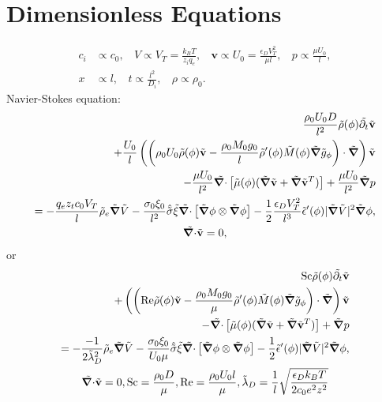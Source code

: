 \documentclass[a4paper,10pt]{article}
\renewcommand{\v}[1]{\mathbf{#1}}
\renewcommand{\v}[1]{\ensuremath{\mathbf{#1}}} %
\newcommand{\ti}[1]{\ensuremath{\tilde{#1}}} %
\newcommand{\gv}[1]{\ensuremath{\mbox{\boldmath$ #1 $}}}
\newcommand{\grad}[1]{\gv{\nabla} #1} %
\renewcommand{\div}[1]{\gv{\nabla} \cdot #1} %
\newcommand{\pdt}[1]{\partial_t #1}
\begin{document}
\section{Dimensionless Equations}
\begin{align}
c_i &\propto c_0, ~~~~ V \propto V_T = \frac{k_B T}{z_i q_e}, ~~~~\v{v} \propto U_0 = \frac{\epsilon_D V_T^2}{\mu l}, ~~~~p \propto \frac{\mu U_0}{l},\\
x &\propto l , ~~~~ t \propto \frac{l^2}{D_i}, ~~~~ \rho \propto \rho_0.
\end{align}
Navier-Stokes equation: 
\begin{gather}
\begin{split}	
\frac{\rho_0 U_0 D}{ l^2}\ti{\rho}(\phi) \ti{\pdt{}} \ti{\v{v}}\\
+ \frac{U_0}{l}\left( \left( \rho_0 
 	U_0 \ti\rho(\phi) \ti{\v{v}} - \frac{\rho_0 M_0 g_0}{l}\ti\rho'(\phi) \ti M(\phi) \ti{\grad{}} \ti g_\phi  \right) \cdot \ti{\grad{}} \right) \ti{\v{v}}\\
- \frac{\mu U_0}{l^2}\ti{\div{}} \left[\ti \mu(\phi)(\ti{\grad{}} \ti{\v{v}} + \ti{\grad{}} \ti{\v{v}} ^T) \right] + \frac{\mu U_0}{l^2}\ti{\grad{}} p \\
= - \frac{q_e z_t c_0 V_T}{l} \ti \rho_e \ti{\grad{}} \ti{V} - \frac{\sigma_0 \xi_0 }{l^2}\hat{\ti{\sigma}} \ti \xi\ti{\div{}} \left[ \ti{\grad{}} \phi \otimes \ti{\grad{}} \phi \right] - \frac 1 2 \frac{\epsilon_D V_T^2}{l^3} \ti \epsilon'(\phi) | \ti{\grad{}} \ti V |^2 \ti{\grad{}} \phi,
\end{split}\\
\ti{\div{}} \ti{\v{v}} = 0, 
\end{gather}
or 
\begin{gather}
\begin{split}	
\mathrm{Sc} \ti{\rho}(\phi) \ti{\pdt{}} \ti{\v{v}}\\
+ \left( \left( \mathrm{Re} \ti\rho(\phi) \ti{\v{v}} - \frac{\rho_0 M_0 g_0}{\mu}\ti\rho'(\phi) \ti M(\phi) \ti{\grad{}} \ti g_\phi  \right) \cdot \ti{\grad{}} \right) \ti{\v{v}}\\
- \ti{\div{}} \left[\ti \mu(\phi)(\ti{\grad{}} \ti{\v{v}} + \ti{\grad{}} \ti{\v{v}} ^T) \right] + \ti{\grad{}} p \\
= - \frac{-1}{2\tilde{\lambda}_D^2} \ti \rho_e \ti{\grad{}} \ti{V} - \frac{\sigma_0 \xi_0 }{U_0 \mu}\hat{\ti{\sigma}} \ti \xi\ti{\div{}} \left[ \ti{\grad{}} \phi \otimes \ti{\grad{}} \phi \right] - \frac 1 2 \ti \epsilon'(\phi) | \ti{\grad{}} \ti V |^2 \ti{\grad{}} \phi,
\end{split}\\
\ti{\div{}} \ti{\v{v}} = 0, \mathrm{Sc} = \frac{\rho_0 D}{\mu},\mathrm{Re} = \frac{\rho_0 
	U_0 l}{\mu} ,\tilde{\lambda}_D = \frac{1}{l}\sqrt{\frac{\epsilon_D k_B T}{2 c_0 e^2 z^2}} 
\end{gather}
\end{document}
